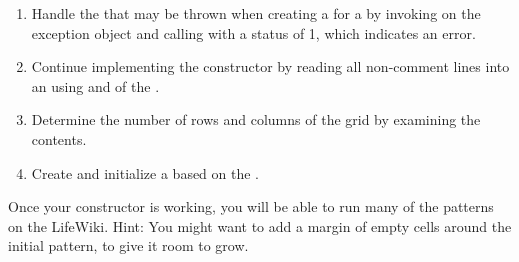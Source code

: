 \begin{exercise}
\begin{enumerate}
\item Handle the  that may be thrown when creating a  for a  by invoking  on the exception object and calling  with a status of 1, which indicates an error.

\item Continue implementing the constructor by reading all non-comment lines into an  using  and  of the .

\item Determine the number of rows and columns of the grid by examining the  contents.

\item Create and initialize a  based on the .

\end{enumerate}

Once your constructor is working, you will be able to run many of the patterns on the LifeWiki.
Hint: You might want to add a margin of empty cells around the initial pattern, to give it room to grow.

\end{exercise}


